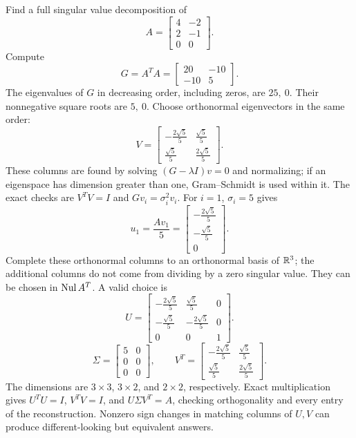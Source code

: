 \goal Find a full singular value decomposition of
\[A=\begin{bmatrix}4&-2\\2&-1\\0&0\end{bmatrix}.\]
Compute
\[G=A^TA=\begin{bmatrix}20&-10\\-10&5\end{bmatrix}.\]
The eigenvalues of $G$ in decreasing order, including zeros, are $25,\ 0$. Their nonnegative square roots are $5,\ 0$. Choose orthonormal eigenvectors in the same order:
\[V=\begin{bmatrix}- \frac{2 \sqrt{5}}{5}&\frac{\sqrt{5}}{5}\\\frac{\sqrt{5}}{5}&\frac{2 \sqrt{5}}{5}\end{bmatrix}.\]
These columns are found by solving $(G-\lambda I)v=0$ and normalizing; if an eigenspace has dimension greater than one, Gram--Schmidt is used within it. The exact checks are $V^TV=I$ and $Gv_i=\sigma_i^2v_i$.
For $i=1$, $\sigma_i=5$ gives
\[u_{1}=\frac{Av_{1}}{5}=\begin{bmatrix}- \frac{2 \sqrt{5}}{5}\\- \frac{\sqrt{5}}{5}\\0\end{bmatrix}.\]
Complete these orthonormal columns to an orthonormal basis of $\mathbb{R}^{3}$; the additional columns do not come from dividing by a zero singular value. They can be chosen in $\operatorname{Nul} A^T$.
A valid choice is
\[U=\begin{bmatrix}- \frac{2 \sqrt{5}}{5}&\frac{\sqrt{5}}{5}&0\\- \frac{\sqrt{5}}{5}&- \frac{2 \sqrt{5}}{5}&0\\0&0&1\end{bmatrix}.\]
\[\Sigma=\begin{bmatrix}5&0\\0&0\\0&0\end{bmatrix},\qquad V^T=\begin{bmatrix}- \frac{2 \sqrt{5}}{5}&\frac{\sqrt{5}}{5}\\\frac{\sqrt{5}}{5}&\frac{2 \sqrt{5}}{5}\end{bmatrix}.\]
The dimensions are $3\times3$, $3\times2$, and $2\times2$, respectively. Exact multiplication gives $U^TU=I$, $V^TV=I$, and $U\Sigma V^T=A$, checking orthogonality and every entry of the reconstruction. Nonzero sign changes in matching columns of $U,V$ can produce different-looking but equivalent answers.


